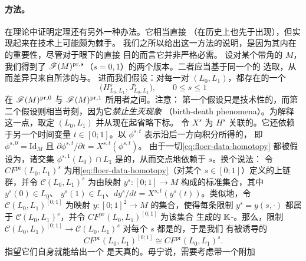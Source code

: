 \paragraph{\trHomotopy{}方法。}\label{sub:homotopy-method}
在\trFloer{}理论中证明\trWellDefinedness{}定理还有另外一种办法。它相当直接
（在历史上也先于\trContinuationMap{}出现），但实现起来在技术上可能颇为棘手。
我们之所以给出这一方法的说明，是因为其内在的重要性，尽管对于眼下的直接
目的而言它并非严格必需。
设对某个带角的\trExactSymplectic\trManifold{} $M$，我们得到了\trFukayaCategory{}
$\mathscr{F}(M)^{\mathrm{pr},s}$（$s=0,1$）的两个版本。二者应当基于同一个\trStriplikeEnd{}的%
\trUniversal{}选取，从而差异只来自所涉的\trFloerDatum{}与\trPerturbationDatum{}。%
进而我们假设：对每一对 $(L_0,L_1)$，都存在\trFloerDatum{}的一个\trSmooth\trHomotopy
\begin{equation}\label{eq:floer-data-homotopy}
\bigl(H^s_{L_0,L_1},J^s_{L_0,L_1}\bigr),\qquad 0\le s\le 1
\end{equation}
在 $\mathscr{F}(M)^{\mathrm{pr},0}$ 与 $\mathscr{F}(M)^{\mathrm{pr},1}$ 所用者之间\trInterpolation。注意：
第一个假设只是技术性的，而第二个假设则相当苛刻，因为它\emph{禁止生灭现象}%
（birth-death phenomena）。为解释这一点，取定 $(L_0,L_1)$ 并从现在起省略下标。
令 $X^s$ 为 $H^s$ 关联的\trHamiltonianVectorField。它还依赖于另一个时间变量
$t\in[0;1]$。以 $\phi^{s,t}$ 表示沿后一方向积分所得的\trHamiltonian\trDiffeomorphism\trFamily，%
即 $\phi^{s,0}=\mathrm{Id}_M$ 且 $\partial\phi^{s,t}/\partial t=X^{s,t}(\phi^{s,t})$。
由于一切\eqref{eq:floer-data-homotopy} 都被假设为\trFloerDatum，诸交集
$\phi^{s,1}(L_0)\cap L_1$ 是\trTransverse{}的，从而交点\trSmooth{}地依赖于 $s$。换个说法：
令 $CF^{\mathrm{pr}}(L_0,L_1)^s$ 为用\eqref{eq:floer-data-homotopy}（对某个
$s\in[0;1]$）定义的\trFloer{}上链群，并令 $\mathscr{C}(L_0,L_1)^s$
为由映射 $y^s\colon[0;1]\to M$ 构成的标准\trGenerator{}集合，其中 $y^s(0)\in L_0$、
$y^s(1)\in L_1$、$dy^s/dt=X^{s,t}(y^s(t))$。类似地，令 $\mathscr{C}(L_0,L_1)^{[0;1]}$
为\trSmooth{}映射 $y\colon[0;1]^2\to M$ 的集合，使得每条限制 $y^s=y(s,\cdot)$
都属于 $\mathscr{C}(L_0,L_1)^s$，并令 $CF^{\mathrm{pr}}(L_0,L_1)^{[0;1]}$ 为该集合%
生成的 $\mathbb{K}$-\trVectorSpace。那么，限制\trMorphism{}
$\mathscr{C}(L_0,L_1)^{[0;1]}\to\mathscr{C}(L_0,L_1)^s$ 对每个 $s$ 都是\trBijective{}的，于是我们%
有被诱导的\trIsomorphism
\begin{equation}\label{eq:cf-homotopy-identification}
CF^{\mathrm{pr}}(L_0,L_1)^{[0;1]}\cong CF^{\mathrm{pr}}(L_0,L_1)^s.
\end{equation}
指望它们自身就能给出一个 \trAFunctor{}是天真的。毋宁说，需要考虑带一个附加
